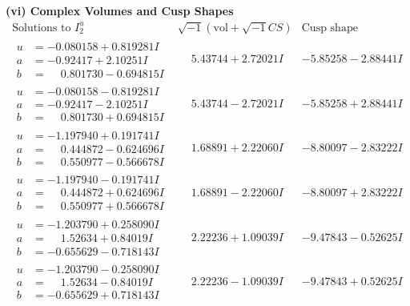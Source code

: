 \documentclass[1p]{elsarticle_modified}
\theoremstyle{definition}
\newcommand{\I}{\sqrt{-1}}
\begin{document}
\newpage\flushleft \textbf{(vi) Complex Volumes and Cusp Shapes}
$$\begin{array}{c|c|c}  
\text{Solutions to }I^u_{2}& \I (\text{vol} + \sqrt{-1}CS) & \text{Cusp shape}\\
 \hline 
\begin{aligned}
u &= -0.080158 + 0.819281 I \\
a &= -0.92417 + 2.10251 I \\
b &= \phantom{-}0.801730 - 0.694815 I\end{aligned}
 & \phantom{-}5.43744 + 2.72021 I & -5.85258 - 2.88441 I \\ \hline\begin{aligned}
u &= -0.080158 - 0.819281 I \\
a &= -0.92417 - 2.10251 I \\
b &= \phantom{-}0.801730 + 0.694815 I\end{aligned}
 & \phantom{-}5.43744 - 2.72021 I & -5.85258 + 2.88441 I \\ \hline\begin{aligned}
u &= -1.197940 + 0.191741 I \\
a &= \phantom{-}0.444872 - 0.624696 I \\
b &= \phantom{-}0.550977 - 0.566678 I\end{aligned}
 & \phantom{-}1.68891 + 2.22060 I & -8.80097 - 2.83222 I \\ \hline\begin{aligned}
u &= -1.197940 - 0.191741 I \\
a &= \phantom{-}0.444872 + 0.624696 I \\
b &= \phantom{-}0.550977 + 0.566678 I\end{aligned}
 & \phantom{-}1.68891 - 2.22060 I & -8.80097 + 2.83222 I \\ \hline\begin{aligned}
u &= -1.203790 + 0.258090 I \\
a &= \phantom{-}1.52634 + 0.84019 I \\
b &= -0.655629 - 0.718143 I\end{aligned}
 & \phantom{-}2.22236 + 1.09039 I & -9.47843 - 0.52625 I \\ \hline\begin{aligned}
u &= -1.203790 - 0.258090 I \\
a &= \phantom{-}1.52634 - 0.84019 I \\
b &= -0.655629 + 0.718143 I\end{aligned}
 & \phantom{-}2.22236 - 1.09039 I & -9.47843 + 0.52625 I \\ \hline\begin{aligned}

\end{aligned}
\end{array}$$
\end{document}
